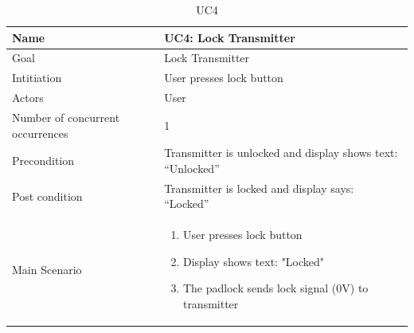 \documentclass[oneside]{memoir}
\begin{document}
\begin{table}[]
\centering
\caption{UC4}
\label{my-label}
\begin{tabularx}{\textwidth}{|l X|}
\hline
Name                             & UC4: Lock Transmitter   \\ \hline
Goal                             & Lock Transmitter   \\ \hline
Intitiation                      & User presses lock button         \\ \hline
Actors                           & User                              \\ \hline
Number of concurrent occurrences & 1                                          \\ \hline
Precondition                     & Transmitter is unlocked and display shows text: “Unlocked” \\ \hline
Post condition                   & Transmitter is locked and display says: “Locked”  \\ \hline
Main Scenario                    & \begin{enumerate}
                                    \item User presses lock button

                                    \item Display shows text: "Locked"
                                    
                                    
                                    \item The padlock sends lock signal (0V) to transmitter
                                    \end{enumerate} \\ \hline

\end{tabularx}
\end{table}
\end{document}
